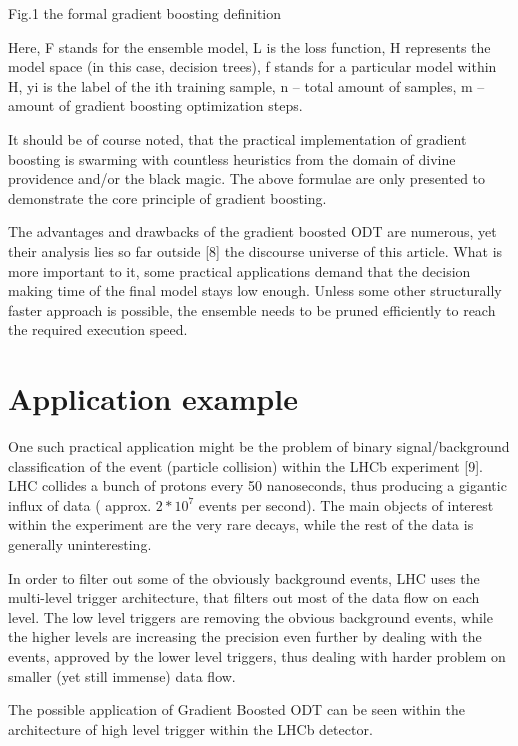 \documentclass[twoside]{article}
\begin{document}
\begin{multicols}{2}
Fig.1 the formal gradient boosting definition

Here, F stands for the ensemble model, L is the loss function, H represents the model space (in this case, decision trees), f stands for a particular model within H, yi is the label of the ith training sample, n – total amount of samples, m – amount of gradient boosting optimization steps.

It should be of course noted, that the practical implementation of gradient boosting is swarming with countless heuristics from the domain of divine providence and/or the black magic. The above formulae are only presented to demonstrate the core principle of gradient boosting.

The advantages and drawbacks of the gradient boosted ODT are numerous, yet their analysis lies so far outside [8] the discourse universe of this article. What is more important to it, some practical applications demand that the decision making time of the final model stays low enough. Unless some other structurally faster approach is possible, the ensemble needs to be pruned efficiently to reach the required execution speed.


\section{Application example}

One such practical application might be the problem of binary signal/background classification of the event (particle collision) within the LHCb experiment [9]. LHC collides a bunch of protons every 50 nanoseconds, thus producing a gigantic influx of data ( approx.  ${2*10^7}$  events per second). The main objects of interest within the experiment are the very rare decays, while the rest of the data is generally uninteresting.

In order to filter out some of the obviously background events, LHC uses the multi-level trigger architecture, that filters out most of the data flow on each level. The low level triggers are removing the obvious background events, while the higher levels are increasing the precision even further by dealing with the events, approved by the lower level triggers, thus dealing with harder problem on smaller (yet still immense) data flow.

The possible application of Gradient Boosted ODT can be seen within the architecture of high level trigger within the LHCb detector.


\end{multicols}
\end{document}
